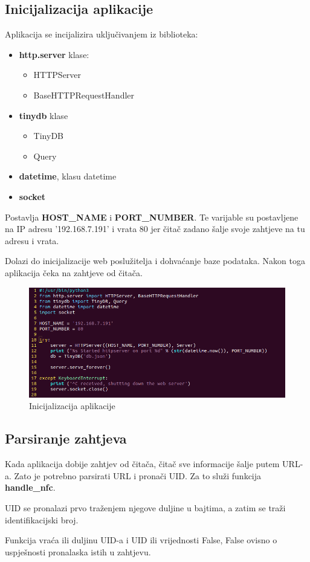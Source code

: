\documentclass[times, utf8, zavrsni]{fer}
\begin{document}
\subsection{Inicijalizacija aplikacije}
Aplikacija se incijalizira uključivanjem iz biblioteka:
\begin{itemize}
\item \textbf{http.server} klase:
	\begin{itemize}
	\item HTTPServer
	\item BaseHTTPRequestHandler
	\end{itemize}
\item \textbf{tinydb} klase
	\begin{itemize}
	\item TinyDB
	\item Query
	\end{itemize}
\item \textbf{datetime}, klasu datetime
\item \textbf{socket}
\end{itemize}

Postavlja \textbf{HOST\_NAME} i \textbf{PORT\_NUMBER}. Te varijable su postavljene na IP adresu '192.168.7.191' i vrata 80  jer čitač zadano šalje svoje zahtjeve na tu adresu i vrata.\par
Dolazi do inicijalizacije web poslužitelja i dohvaćanje baze podataka. Nakon toga aplikacija čeka na zahtjeve od čitača.

\begin{figure}[h]
\includegraphics[scale=0.5]{init.png}
\centering
\caption{Inicijalizacija aplikacije}
\centering
\end{figure}

\subsection{Parsiranje zahtjeva}
Kada aplikacija dobije zahtjev od čitača, čitač sve informacije šalje putem URL-a. Zato je potrebno parsirati URL i pronači UID. Za to služi funkcija \textbf{handle\_nfc}.\par
UID se pronalazi prvo traženjem njegove duljine u bajtima, a zatim se traži identifikacijski broj.\par 
Funkcija vraća ili duljinu UID-a i UID ili vrijednosti False, False ovisno o uspješnosti pronalaska istih u zahtjevu.
\end{document}
